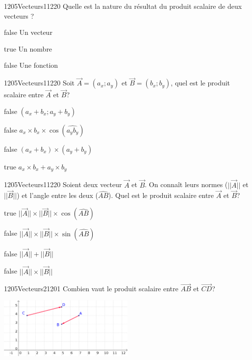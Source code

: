             \begin{question}{1205}{Vecteurs}{1}{1220}
				Quelle est la nature du résultat du produit scalaire de deux vecteurs ?
            \end{question}
            \begin{reponses}
            	\item[false] Un vecteur
            	\item[true] Un nombre
                \item[false] Une fonction
            \end{reponses}
        	\begin{question}{1205}{Vecteurs}{1}{1220}
				Soit $\vec{A}=(a_x;a_y)$ et $\vec{B}=(b_x;b_y)$, quel est le produit scalaire entre $\vec{A}$ et $\vec{B}$?
            \end{question}
            \begin{reponses}
            	\item[false] $(a_x+b_x;a_y+b_y)$
            	\item[false] $a_x\times b_x\times \cos(\widehat{a_y b_y})$
                \item[false] $(a_x+b_x)\times (a_y+b_y)$
                \item[true] $a_x\times b_x+a_y\times b_y$
            \end{reponses}
        	\begin{question}{1205}{Vecteurs}{1}{1220}
				Soient deux vecteur $\vec{A}$ et $\vec{B}$. On connaît leurs normes ($||\vec{A}||$ et $||\vec{B}||$) et l'angle entre les deux ($\widehat{AB}$). Quel est le produit scalaire entre $\vec{A}$ et $\vec{B}$?
            \end{question}
            \begin{reponses}
            	\item[true] $||\vec{A}||\times ||\vec{B}||\times \cos(\widehat{AB})$
            	\item[false] $||\vec{A}||\times ||\vec{B}||\times \sin(\widehat{AB})$
                \item[false] $||\vec{A}||+||\vec{B}||$
                \item[false] $||\vec{A}||\times ||\vec{B}||$
            \end{reponses}
            \begin{question}{1205}{Vecteurs}{2}{1201}
                Combien vaut le produit scalaire entre $\vec{AB}$ et $\vec{CD}$?\\
                \begin{center}
                	\includegraphics[width=0.5\textwidth]{Philippe/Figures_Philippe/vecteurs_4_5.png}
                \end{center}
            \end{question}
